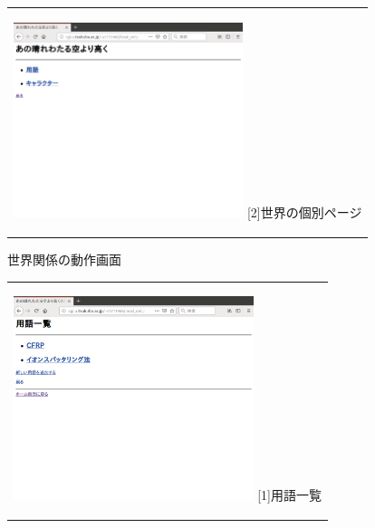 \documentclass[12pt,a4paper]{jarticle}
\begin{document}
\begin{ttfamily}
\begin{figure}[htbp]
\begin{center}
\begin{tabular}{c}
      \begin{minipage}{0.55\hsize}
        \begin{center}
          \includegraphics[width=6.7cm]{10-3-6.eps}
          \hspace{1.6cm} [2]世界の個別ページ
        \end{center}
      \end{minipage}

    \end{tabular}
    \caption{世界関係の動作画面}
    \label{fig:b}
  \end{center}
\end{figure}

\begin{figure}[htbp]
  \begin{center}
    \begin{tabular}{c}

      \begin{minipage}{0.55\hsize}
        \begin{center}
          \includegraphics[width=7.0cm]{10-3-7.eps}
          \hspace{1.6cm} [1]用語一覧
        \end{center}
      \end{minipage}


\end{tabular}
\end{center}
\end{figure}
\end{ttfamily}
\end{document}
